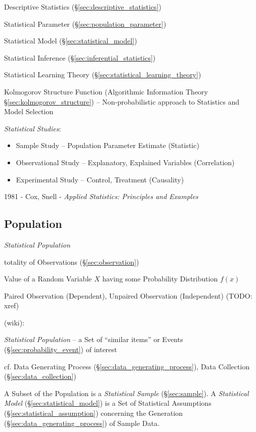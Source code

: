 Descriptive Statistics (\S\ref{sec:descriptive_statistics})

Statistical Parameter (\S\ref{sec:population_parameter})

Statistical Model (\S\ref{sec:statistical_model})

Statistical Inference (\S\ref{sec:inferential_statistics})

Statistical Learning Theory (\S\ref{sec:statistical_learning_theory})

Kolmogorov Structure Function (Algorithmic Information Theory
\S\ref{sec:kolmogorov_structure}) -- Non-probabilistic approach to Statistics
and Model Selection

\emph{Statistical Studies}:
\begin{itemize}
  \item Sample Study -- Population Parameter Estimate (Statistic)
  \item Observational Study -- Explanatory, Explained Variables (Correlation)
  \item Experimental Study -- Control, Treatment (Causality)
\end{itemize}

1981 - Cox, Snell - \emph{Applied Statistics: Principles and Examples}



\subsection{Population}\label{sec:population}

\emph{Statistical Population}

totality of Observations (\S\ref{sec:observation})

Value of a Random Variable $X$ having some Probability Distribution $f(x)$

Paired Observation (Dependent), Unpaired Observation (Independent) (TODO: xref)

(wiki):

\emph{Statistical Population} -- a Set of ``similar items'' or Events
(\S\ref{sec:probability_event}) of interest

\fist cf. Data Generating Process (\S\ref{sec:data_generating_process}), Data
Collection (\S\ref{sec:data_collection})

A Subset of the Population is a \emph{Statistical Sample} (\S\ref{sec:sample}).
A \emph{Statistical Model} (\S\ref{sec:statistical_model}) is a Set of
Statistical Assumptions (\S\ref{sec:statistical_assumption}) concerning the
Generation (\S\ref{sec:data_generating_process}) of Sample Data.

